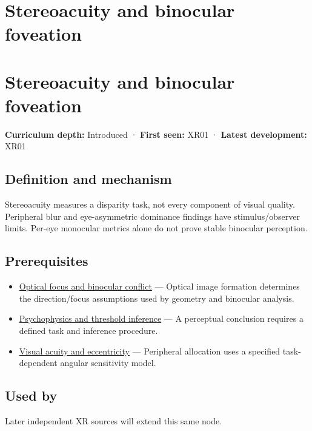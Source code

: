 \hypertarget{appendix-8dc848f14052}{}
\section*{Stereoacuity and binocular foveation}
\section{Stereoacuity and binocular foveation}\label{appendix-8dc848f14052-stereoacuity-and-binocular-foveation}

\textbf{Curriculum depth:} Introduced · \textbf{First seen:} XR01 · \textbf{Latest development:} XR01

\subsection{Definition and mechanism}\label{appendix-8dc848f14052-definition-and-mechanism}

Stereoacuity measures a disparity task, not every component of visual quality. Peripheral blur and eye-asymmetric dominance findings have stimulus/observer limits. Per-eye monocular metrics alone do not prove stable binocular perception.

\subsection{Prerequisites}\label{appendix-8dc848f14052-prerequisites}

\begin{itemize}
\tightlist
\item
  \hyperref[appendix-f90cee1be7a4]{Optical focus and binocular conflict} --- Optical image formation determines the direction/focus assumptions used by geometry and binocular analysis.
\item
  \hyperref[appendix-1759f03e8ce7]{Psychophysics and threshold inference} --- A perceptual conclusion requires a defined task and inference procedure.
\item
  \hyperref[appendix-b491fc48c54b]{Visual acuity and eccentricity} --- Peripheral allocation uses a specified task-dependent angular sensitivity model.
\end{itemize}

\subsection{Used by}\label{appendix-8dc848f14052-used-by}

Later independent XR sources will extend this same node.

